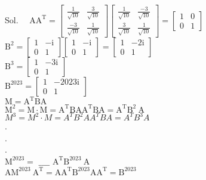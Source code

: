 \documentclass[10pt]{article}
\begin{document}
Sol. \(\quad \mathrm{AA}^{\mathrm{T}}=\left[\begin{array}{ll}\frac{1}{\sqrt{10}} & \frac{3}{\sqrt{10}} \\ \frac{-3}{\sqrt{10}} & \frac{1}{\sqrt{10}}\end{array}\right]\left[\begin{array}{ll}\frac{1}{\sqrt{10}} & \frac{-3}{\sqrt{10}} \\ \frac{3}{\sqrt{10}} & \frac{1}{\sqrt{10}}\end{array}\right]=\left[\begin{array}{ll}1 & 0 \\ 0 & 1\end{array}\right]\)\\
\(\mathrm{B}^{2}=\left[\begin{array}{cc}1 & -\mathrm{i} \\ 0 & 1\end{array}\right]\left[\begin{array}{cc}1 & -\mathrm{i} \\ 0 & 1\end{array}\right]=\left[\begin{array}{cc}1 & -2 \mathrm{i} \\ 0 & 1\end{array}\right]\)\\
\(\mathrm{B}^{3}=\left[\begin{array}{cc}1 & -3 \mathrm{i} \\ 0 & 1\end{array}\right]\)\\
\(\mathrm{B}^{2023}=\left[\begin{array}{cc}1 & -2023 \mathrm{i} \\ 0 & 1\end{array}\right]\)\\
\(\mathrm{M}=\mathrm{A}^{\mathrm{T}} \mathrm{BA}\)\\
\(\mathrm{M}^{2}=\mathrm{M} \cdot \mathrm{M}=\mathrm{A}^{\mathrm{T}} \mathrm{BA} \mathrm{A}^{\mathrm{T}} \mathrm{BA}=\mathrm{A}^{\mathrm{T}} \mathrm{B}^{2} \mathrm{~A}\)\\
\(M^{3}=M^{2} \cdot M=A^{T} B^{2} A A^{T} B A=A^{T} B^{3} A\)\\
.\\
.\\
.\\
\(\mathrm{M}^{2023}=\) \(\_\_\_\_\) \(\mathrm{A}^{\mathrm{T}} \mathrm{B}^{2023} \mathrm{~A}\)\\
\(\mathrm{AM}^{2023} \mathrm{~A}^{\mathrm{T}}=\mathrm{AA}^{\mathrm{T}} \mathrm{B}^{2023} \mathrm{AA}^{\mathrm{T}}=\mathrm{B}^{2023}\)\\
\end{document}
